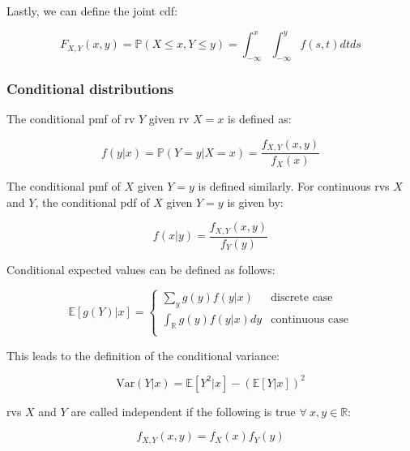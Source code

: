 \documentclass{report}
\begin{document}
Lastly, we can define the joint \gls{cdf}:

\begin{equation}\label{eq:joint-cdf}
    F_{X, Y}(x,y) = \mathbb{P}(X \leq x, Y \leq y) = \int_{-\infty}^x \int_{-\infty}^y f(s,t)dtds
\end{equation}

\subsubsection{Conditional distributions}

The conditional \gls{pmf} of \gls{rv} $Y$ given \gls{rv} $X = x$ is defined as:

\begin{equation}\label{eq:conditional-pmf}
    f(y|x) = \mathbb{P}(Y = y | X = x) = \frac{f_{X, Y}(x,y)}{f_X(x)}
\end{equation}

The conditional \gls{pmf} of $X$ given $Y = y$ is defined similarly. For continuous \glspl{rv} $X$ and $Y$, the conditional \gls{pdf} of $X$ given $Y = y$ is given by:

\begin{equation}\label{eq:conditional-pdf}
    f(x|y) = \frac{f_{X, Y}(x,y)}{f_Y(y)}
\end{equation}

Conditional expected values can be defined as follows:

\begin{equation}\label{eq:conditional-ev}
    \mathbb{E}[g(Y) | x] = \begin{cases}
        \sum_y g(y)f(y|x) & \text{discrete case} \\
        \int_{\mathbb{R}} g(y) f(y|x) dy & \text{continuous case} \\
    \end{cases}
\end{equation}

This leads to the definition of the conditional variance:

\begin{equation}\label{eq:conditional-variance-1}
    \text{Var}(Y|x) = \mathbb{E}\left[Y^2|x\right] - \left(\mathbb{E}[Y|x]\right)^2
\end{equation}

\glspl{rv} $X$ and $Y$ are called independent if the following is true $\forall \: x, y \in \mathbb{R}$:

\begin{equation}\label{eq:independent-distributions}
    f_{X, Y}(x,y) = f_X(x)f_Y(y)
\end{equation}
\end{document}
